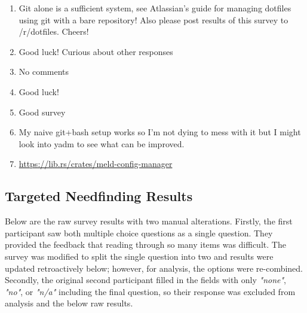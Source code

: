 \documentclass[letterpaper]{jdf}
\begin{document}
\begin{itemize}
\begin{enumerate}
        \item Git alone is a sufficient system, see Atlassian's guide for managing dotfiles using git with a bare repository! Also please post results of this survey to /r/dotfiles. Cheers!
        \item Good luck! Curious about other responses
        \item No comments
        \item Good luck!
        \item Good survey
        \item My naive git+bash setup works so I'm not dying to mess with it but I might look into yadm to see what can be improved.
        \item \href{https://lib.rs/crates/meld-config-manager}{https://lib.rs/crates/meld-config-manager}
    \end{enumerate}
\end{itemize}

\subsection{Targeted Needfinding Results}\label{appendix:targeted_needfinding}
Below are the raw survey results with two manual alterations. Firstly, the first participant saw both multiple choice questions as a single question. They provided the feedback that reading through so many items was difficult. The survey was modified to split the single question into two and results were updated retroactively below; however, for analysis, the options were re-combined. Secondly, the original second participant filled in the fields with only \emph{"none"}, \emph{"no"}, or \emph{"n/a"} including the final question, so their response was excluded from analysis and the below raw results.
\end{document}
